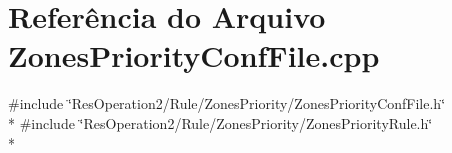 \section{Referência do Arquivo Zones\+Priority\+Conf\+File.\+cpp}
\label{_zones_priority_conf_file_8cpp}
{\ttfamily \#include \char`\"{}Res\+Operation2/\+Rule/\+Zones\+Priority/\+Zones\+Priority\+Conf\+File.\+h\char`\"{}}\\*
{\ttfamily \#include \char`\"{}Res\+Operation2/\+Rule/\+Zones\+Priority/\+Zones\+Priority\+Rule.\+h\char`\"{}}\\*
